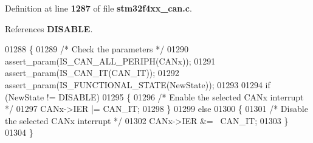 Definition at line \textbf{ 1287} of file \textbf{ stm32f4xx\+\_\+can.\+c}.



References \textbf{ D\+I\+S\+A\+B\+LE}.


\begin{DoxyCode}
01288 \{
01289   \textcolor{comment}{/* Check the parameters */}
01290   assert_param(IS_CAN_ALL_PERIPH(CANx));
01291   assert_param(IS_CAN_IT(CAN\_IT));
01292   assert_param(IS_FUNCTIONAL_STATE(NewState));
01293 
01294   \textcolor{keywordflow}{if} (NewState != DISABLE)
01295   \{
01296     \textcolor{comment}{/* Enable the selected CANx interrupt */}
01297     CANx->IER |= CAN\_IT;
01298   \}
01299   \textcolor{keywordflow}{else}
01300   \{
01301     \textcolor{comment}{/* Disable the selected CANx interrupt */}
01302     CANx->IER &= ~CAN\_IT;
01303   \}
01304 \}
\end{DoxyCode}
